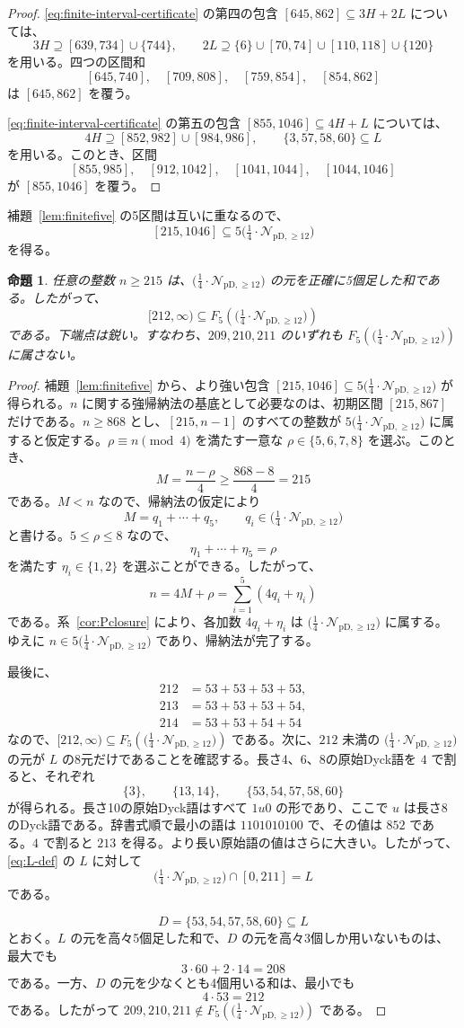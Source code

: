 \documentclass[12pt]{ltjsarticle}
\theoremstyle{plain}
\newtheorem{proposition}[theorem]{命題}
\theoremstyle{definition}
\theoremstyle{plain}
\newcommand{\Pset}{%
  \bigl(\tfrac{1}{4}\cdot\mathcal{N}_{\mathrm{pD},\geq 12}\bigr)%
}
\begin{document}
\begin{proof}
\eqref{eq:finite-interval-certificate} の第四の包含 $[645,862]\subseteq3H+2L$ については、
\[
 3H\supseteq[639,734]\cup\{744\},\qquad
 2L\supseteq\{6\}\cup[70,74]\cup[110,118]\cup\{120\}
\]
を用いる。四つの区間和
\[
 [645,740],\quad[709,808],\quad[759,854],\quad[854,862]
\]
は $[645,862]$ を覆う。

\eqref{eq:finite-interval-certificate} の第五の包含 $[855,1046]\subseteq4H+L$ については、
\[
 4H\supseteq[852,982]\cup[984,986],
 \qquad \{3,57,58,60\}\subseteq L
\]
を用いる。このとき、区間
\[
 [855,985],\quad[912,1042],\quad[1041,1044],\quad[1044,1046]
\]
が $[855,1046]$ を覆う。
\end{proof}

補題~\ref{lem:finitefive} の5区間は互いに重なるので、
\[
 [215,1046]\subseteq5\Pset
\]
を得る。

\begin{proposition}\label{prop:fiveP}
任意の整数 $n\geq215$ は、$\Pset$ の元を正確に5個足した和である。したがって、
\[
 [212,\infty)\subseteq F_5(\Pset)
\]
である。下端点は鋭い。すなわち、$209,210,211$ のいずれも $F_5(\Pset)$ に属さない。
\end{proposition}

\begin{proof}
補題~\ref{lem:finitefive} から、より強い包含 $[215,1046]\subseteq5\Pset$ が得られる。$n$ に関する強帰納法の基底として必要なのは、初期区間 $[215,867]$ だけである。$n\geq868$ とし、$[215,n-1]$ のすべての整数が $5\Pset$ に属すると仮定する。$\rho\equiv n\pmod4$ を満たす一意な $\rho\in\{5,6,7,8\}$ を選ぶ。このとき、
\[
 M=\frac{n-\rho}{4}\geq\frac{868-8}{4}=215
\]
である。$M<n$ なので、帰納法の仮定により
\[
 M=q_1+\cdots+q_5,\qquad q_i\in\Pset
\]
と書ける。$5\leq\rho\leq8$ なので、
\[
 \eta_1+\cdots+\eta_5=\rho
\]
を満たす $\eta_i\in\{1,2\}$ を選ぶことができる。したがって、
\[
 n=4M+\rho=\sum_{i=1}^{5}(4q_i+\eta_i)
\]
である。系~\ref{cor:Pclosure} により、各加数 $4q_i+\eta_i$ は $\Pset$ に属する。ゆえに $n\in5\Pset$ であり、帰納法が完了する。

最後に、
\[
\begin{aligned}
212&=53+53+53+53,\\
213&=53+53+53+54,\\
214&=53+53+54+54
\end{aligned}
\]
なので、$[212,\infty)\subseteq F_5(\Pset)$ である。次に、$212$ 未満の $\Pset$ の元が $L$ の8元だけであることを確認する。長さ4、6、8の原始Dyck語を $4$ で割ると、それぞれ
\[
 \{3\},\qquad \{13,14\},\qquad \{53,54,57,58,60\}
\]
が得られる。長さ10の原始Dyck語はすべて $1u0$ の形であり、ここで $u$ は長さ8のDyck語である。辞書式順で最小の語は $1101010100$ で、その値は $852$ である。$4$ で割ると $213$ を得る。より長い原始語の値はさらに大きい。したがって、\eqref{eq:L-def} の $L$ に対して
\[
 \Pset\cap[0,211]=L
\]
である。

\[
 D=\{53,54,57,58,60\}\subseteq L
\]
とおく。$L$ の元を高々5個足した和で、$D$ の元を高々3個しか用いないものは、最大でも
\[
 3\cdot60+2\cdot14=208
\]
である。一方、$D$ の元を少なくとも4個用いる和は、最小でも
\[
 4\cdot53=212
\]
である。したがって $209,210,211\notin F_5(\Pset)$ である。
\end{proof}
\end{document}
